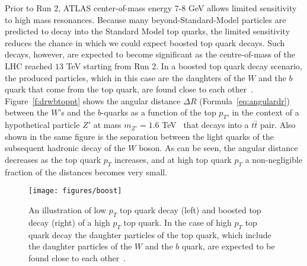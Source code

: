 Prior to Run 2, ATLAS center-of-mass energy 7-8 GeV allows limited sensitivity
to high mass resonances. Because many beyond-Standard-Model particles are
predicted to decay into the Standard Model top quarks, the limited sensitivity
reduces the chance in which we could expect boosted top quark decays. Such
decays, however, are expected to become significant as the centre-of-mass of
the LHC reached $13$ TeV starting from Run 2. In a boosted top quark decay
scenario, the produced particles, which in this case are the daughters of the
$W$ and the $b$ quark that come from the top quark, are found close to each
other~\cite{hadronic01-ch7, hadronic02-ch7, bdis-figs}.
Figure~\ref{f:drwbtoppt} shows the angular distance $\Delta R$
(Formula~\ref{eq:angulardr}) between the $W$'s and the $b$-quarks as a function
of the top $p_T$, in the context of a hypothetical particle $Z'$ at mass
$m_{Z'}=1.6$ TeV~\cite{bdis-figs} that decays into a $t\bar{t}$ pair. Also
shown in the same figure is the separation between the light quarks of the
subsequent hadronic decay of the $W$ boson. As can be seen, the angular
distance decreases as the top quark $p_T$ increases, and at high top quark
$p_T$ a non-negligible fraction of the distances becomes very small.





\vspace{3mm}

\begin{figure}[H]
	\texttt{[image: figures/boost]}
	\centering

	\caption{An illustration of low $p_T$ top quark decay (left) and boosted top
		decay (right) of a high $p_T$ top quark. In the case of high $p_T$ top quark
		decay the daughter particles of the top quark, which include the daughter
		particles of the $W$ and the $b$ quark, are expected to be found close to each
		other~\cite{boostedtop-fig}.}

	\label{f:boosttop}
\end{figure}

